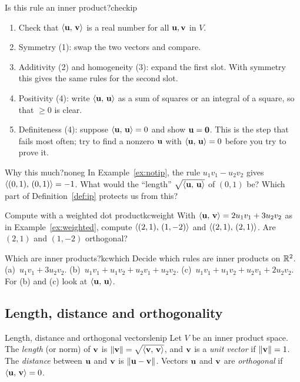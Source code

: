 \documentclass[11pt]{article}
\begin{document}
\begin{proc}{Is this rule an inner product?}{checkip}
\begin{enumerate}[nosep]
  \item Check that $\langle \mathbf{u},\,\mathbf{v}\rangle$ is a real number for all $\mathbf{u},\mathbf{v}$ in $V$.
  \item Symmetry (1): swap the two vectors and compare.
  \item Additivity (2) and homogeneity (3): expand the first slot. With symmetry this gives the same rules for the second slot.
  \item Positivity (4): write $\langle \mathbf{u},\,\mathbf{u}\rangle$ as a sum of squares or an integral of a square, so that $\ge0$ is clear.
  \item Definiteness (4): suppose $\langle \mathbf{u},\,\mathbf{u}\rangle=0$ and show $\mathbf{u}=\mathbf{0}$. This is the step that fails most often; try to find a nonzero $\mathbf{u}$ with $\langle \mathbf{u},\,\mathbf{u}\rangle=0$ before you try to prove it.
\end{enumerate}
\end{proc}

\begin{think}{Why this much?}{noneg}
In Example~\ref{ex:notip}, the rule $u_1v_1-u_2v_2$ gives $\langle (0,1),\,(0,1)\rangle=-1$. What would the ``length'' $\sqrt{\langle \mathbf{u},\,\mathbf{u}\rangle}$ of $(0,1)$ be? Which part of Definition~\ref{def:ip} protects us from this?
\end{think}

\begin{kc}{Compute with a weighted dot product}{kcweight}
With $\langle \mathbf{u},\,\mathbf{v}\rangle=2u_1v_1+3u_2v_2$ as in Example~\ref{ex:weighted}, compute $\langle (2,1),\,(1,-2)\rangle$ and $\langle (2,1),\,(2,1)\rangle$. Are $(2,1)$ and $(1,-2)$ orthogonal?
\end{kc}

\begin{kc}{Which are inner products?}{kcwhich}
Decide which rules are inner products on $\mathbb{R}^2$. (a)~$u_1v_1+3u_2v_2$. (b)~$u_1v_1+u_1v_2+u_2v_1+u_2v_2$. (c)~$u_1v_1+u_1v_2+u_2v_1+2u_2v_2$. For (b) and (c) look at $\langle \mathbf{u},\,\mathbf{u}\rangle$.
\end{kc}

\subsection*{Length, distance and orthogonality}

\begin{defn}{Length, distance and orthogonal vectors}{lenip}
Let $V$ be an inner product space. The \emph{length} (or norm) of $\mathbf{v}$ is $\lVert\mathbf{v}\rVert=\sqrt{\langle \mathbf{v},\,\mathbf{v}\rangle}$, and $\mathbf{v}$ is a \emph{unit vector} if $\lVert\mathbf{v}\rVert=1$. The \emph{distance} between $\mathbf{u}$ and $\mathbf{v}$ is $\lVert\mathbf{u}-\mathbf{v}\rVert$. Vectors $\mathbf{u}$ and $\mathbf{v}$ are \emph{orthogonal} if $\langle \mathbf{u},\,\mathbf{v}\rangle=0$.
\end{defn}
\end{document}
